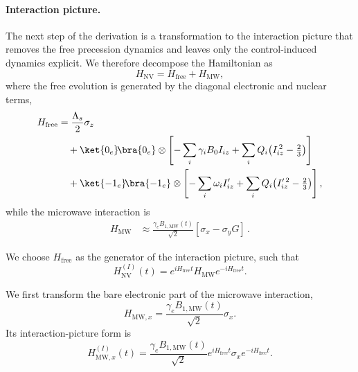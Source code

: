 \paragraph{Interaction picture.}

The next step of the derivation is a transformation to the interaction picture that removes the free precession dynamics and leaves only the control-induced dynamics explicit. We therefore decompose the Hamiltonian as
\begin{equation}
H_{\mathrm{NV}}
=
H_{\mathrm{free}}
+
H_{\mathrm{MW}},
\label{eq:H_split}
\end{equation}
where the free evolution is generated by the diagonal electronic and nuclear
terms,
\begin{equation}
\begin{aligned}
H_{\mathrm{free}}
&=
\frac{\Lambda_s}{2}\sigma_z
\\
&\quad
+
\ket{0_e}\!\bra{0_e}\otimes
\left[
-\sum_i\gamma_iB_0 I_{iz}
+
\sum_iQ_i\!\left(I_{iz}^{\,2}-\tfrac23\right)
\right]
\\
&\quad
+
\ket{-1_e}\!\bra{-1_e}\otimes
\left[
-\sum_i\omega_i I'_{iz}
+
\sum_iQ_i\!\left(I_{iz}'^{\,2}-\tfrac23\right)
\right],
\end{aligned}
\label{eq:H_free}
\end{equation}
while the microwave interaction is
\begin{equation}
\begin{aligned}
H_{\mathrm{MW}}
&\approx
\frac{\gamma_e B_{1,\mathrm{MW}}(t)}{\sqrt2}
\left[
\sigma_x
-
\sigma_y G
\right]\,.
\end{aligned}
\label{eq:HMW_rot}
\end{equation}


We choose \(H_{\mathrm{free}}\) as the generator of the interaction picture, such that
\begin{equation}
H_{\mathrm{NV}}^{(I)}(t)
=
e^{iH_{\mathrm{free}}t}
H_{\mathrm{MW}}
e^{-iH_{\mathrm{free}}t}.
\label{eq:IP_transform}
\end{equation}

We first transform the bare electronic part of the microwave interaction,
\[
H_{\mathrm{MW},x}
=
\frac{\gamma_e B_{1,\mathrm{MW}}(t)}{\sqrt2}\sigma_x .
\]
Its interaction-picture form is
\begin{equation}
H_{\mathrm{MW},x}^{(I)}(t)
=
\frac{\gamma_e B_{1,\mathrm{MW}}(t)}{\sqrt2}
e^{iH_{\mathrm{free}}t}
\sigma_x
e^{-iH_{\mathrm{free}}t}.
\label{eq:HMWx_IP_start}
\end{equation}

